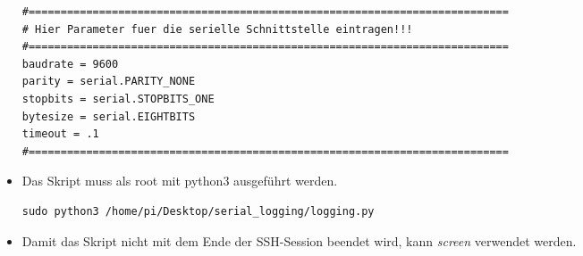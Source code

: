 \documentclass{article}
\begin{document}
\begin{itemize}
\begin{lstlisting}
#=========================================================================== 
# Hier Parameter fuer die serielle Schnittstelle eintragen!!!
#=========================================================================== 
baudrate = 9600
parity = serial.PARITY_NONE
stopbits = serial.STOPBITS_ONE
bytesize = serial.EIGHTBITS
timeout = .1
#=========================================================================== 
\end{lstlisting}

	\item Das Skript muss als root mit python3 ausgeführt werden.
\begin{lstlisting}
sudo python3 /home/pi/Desktop/serial_logging/logging.py
\end{lstlisting}

\item Damit das Skript nicht mit dem Ende der SSH-Session beendet wird, kann \textit{screen} verwendet werden.
\end{itemize}
\end{document}
